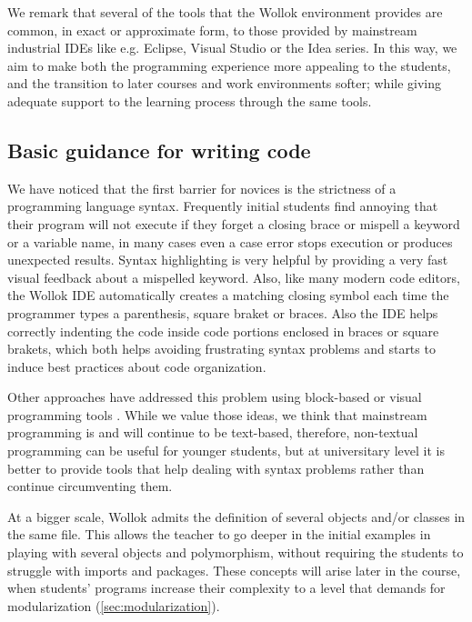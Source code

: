 We remark that several of the tools that the Wollok environment provides are common, in exact or approximate form, to those provided by mainstream industrial IDEs like e.g. Eclipse, Visual Studio or the Idea series. In this way, we aim to make both the programming experience more appealing to the students, and the transition to later courses and work environments softer; while giving adequate support to the learning process through the same tools.

\subsection{Basic guidance for writing code}
We have noticed that the first barrier for novices is the strictness of a programming language syntax. Frequently initial students find annoying that their program will not execute if they forget a closing brace or mispell a keyword or a variable name, in many cases even a case error stops execution or produces unexpected results.
Syntax highlighting is very helpful by providing a very fast visual feedback about a mispelled keyword.
Also, like many modern code editors, the Wollok IDE automatically creates a matching closing symbol each time the programmer types a parenthesis, square braket or braces. 
Also the IDE helps correctly indenting the code inside code portions enclosed in braces or square brakets, which both helps avoiding frustrating syntax problems and starts to induce best practices about code organization.

Other approaches have addressed this problem using block-based or visual programming tools . 
While we value those ideas, we think that mainstream programming is and will continue to be text-based, therefore, non-textual programming can be useful for younger students, but at universitary level it is better to provide tools that help dealing with syntax problems rather than continue circumventing them.

At a bigger scale, Wollok admits the definition of several objects and/or classes in the same file. 
This allows the teacher to go deeper in the initial examples in playing with several objects and polymorphism, without requiring the students to struggle with imports and packages.
These concepts will arise later in the course, when students' programs increase their complexity to a level that demands for modularization (\cf \ref{sec:modularization}).

